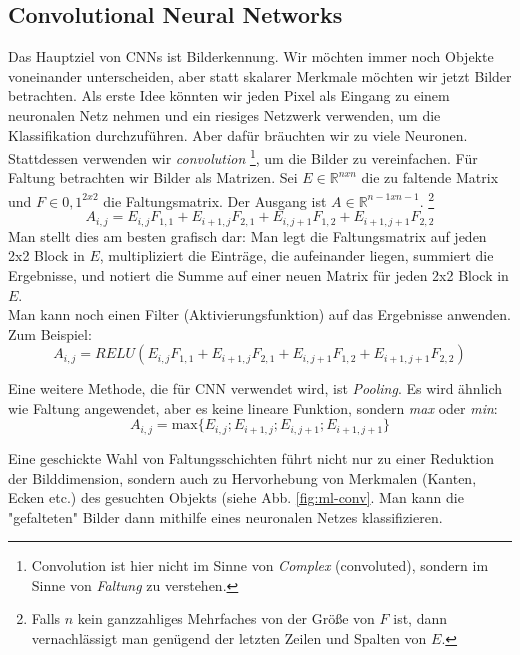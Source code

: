 \subsection{Convolutional Neural Networks}
Das Hauptziel von CNNs ist Bilderkennung. Wir möchten immer noch Objekte voneinander unterscheiden, aber statt skalarer Merkmale möchten wir jetzt Bilder betrachten. Als erste Idee könnten wir jeden Pixel als Eingang zu einem neuronalen Netz nehmen und ein riesiges Netzwerk verwenden, um die Klassifikation durchzuführen. Aber dafür bräuchten wir zu viele Neuronen. Stattdessen verwenden wir \textit{convolution} \footnote{Convolution ist hier nicht im Sinne von \textit{Complex} (convoluted), sondern im Sinne von \textit{Faltung} zu verstehen. }, um die Bilder zu vereinfachen. Für Faltung betrachten wir Bilder als Matrizen. Sei $E \in \mathbb{R}^{nxn}$ die zu faltende Matrix und $F \in {0,1}^{2x2}$ die Faltungsmatrix. Der Ausgang ist $A \in \mathbb{R}^{n-1xn-1}$. \footnote{Falls $n$ kein ganzzahliges Mehrfaches von der Größe von $F$ ist, dann vernachlässigt man genügend der letzten Zeilen und Spalten von $E$.}
\begin{equation}
    A_{i,j} = E_{i,j}F_{1,1} + E_{i+1,j}F_{2,1} + E_{i,j+1}F_{1,2} +E_{i+1,j+1}F_{2,2}     
\end{equation}
Man stellt dies am besten grafisch dar: Man legt die Faltungsmatrix auf jeden 2x2 Block in $E$, multipliziert die Einträge, die aufeinander liegen, summiert die Ergebnisse, und notiert die Summe auf einer neuen Matrix für jeden 2x2 Block in $E$. \\

Man kann noch einen Filter (Aktivierungsfunktion) auf das Ergebnisse anwenden. Zum Beispiel:
\begin{equation}
        A_{i,j} = RELU( E_{i,j}F_{1,1} + E_{i+1,j}F_{2,1} + E_{i,j+1}F_{1,2} +E_{i+1,j+1}F_{2,2} )
\end{equation}

Eine weitere Methode, die für CNN verwendet wird, ist \textit{Pooling}. Es wird ähnlich wie Faltung angewendet, aber es keine lineare Funktion, sondern \textit{max} oder \textit{min}:
\begin{equation}
    A_{i,j} = \mathrm{max}\{E_{i,j};E_{i+1,j};E_{i,j+1};E_{i+1,j+1}\}
\end{equation}

Eine geschickte Wahl von Faltungsschichten führt nicht nur zu einer Reduktion der Bilddimension, sondern auch zu Hervorhebung von Merkmalen (Kanten, Ecken etc.) des gesuchten Objekts (siehe Abb. \ref{fig:ml-conv}. Man kann die "gefalteten" Bilder dann mithilfe eines neuronalen Netzes klassifizieren.

